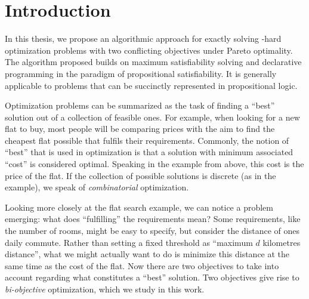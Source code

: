 \chapter{Introduction\label{chap:intro}}

In this thesis, we propose an algorithmic approach for exactly solving \NP-hard optimization problems with two conflicting objectives under Pareto optimality.
The algorithm proposed builds on maximum satisfiability solving and declarative programming in the paradigm of propositional satisfiability.
It is generally applicable to problems that can be succinctly represented in propositional logic.

Optimization problems can be summarized as the task of finding a ``best'' solution out of a collection of feasible ones.
For example, when looking for a new flat to buy, most people will be comparing prices with the aim to find the cheapest flat possible that fulfils their requirements.
Commonly, the notion of ``best'' that is used in optimization is that a solution with minimum associated ``cost'' is considered optimal.
Speaking in the example from above, this cost is the price of the flat.
If the collection of possible solutions is discrete (as in the example), we speak of \emph{combinatorial} optimization.

Looking more closely at the flat search example, we can notice a problem emerging:
what does ``fulfilling'' the requirements mean?
Some requirements, like the number of rooms, might be easy to specify, but consider the distance of ones daily commute.
Rather than setting a fixed threshold as ``maximum $d$ kilometres distance'', what we might actually want to do is minimize this distance at the same time as the cost of the flat.
Now there are two objectives to take into account regarding what constitutes a ``best'' solution.
Two objectives give rise to \emph{bi-objective} optimization, which we study in this work.

